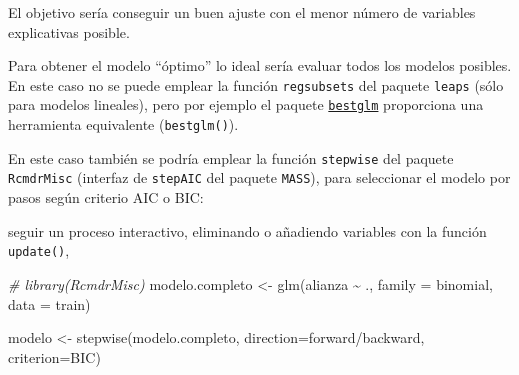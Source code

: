 \documentclass[
]{book}
\newenvironment{Shaded}{\begin{snugshade}}{\end{snugshade}}
\newcommand{\AttributeTok}[1]{\textcolor[rgb]{0.77,0.63,0.00}{#1}}
\newcommand{\CommentTok}[1]{\textcolor[rgb]{0.56,0.35,0.01}{\textit{#1}}}
\newcommand{\FunctionTok}[1]{\textcolor[rgb]{0.00,0.00,0.00}{#1}}
\newcommand{\NormalTok}[1]{#1}
\newcommand{\OtherTok}[1]{\textcolor[rgb]{0.56,0.35,0.01}{#1}}
\newcommand{\SpecialCharTok}[1]{\textcolor[rgb]{0.00,0.00,0.00}{#1}}
\newcommand{\StringTok}[1]{\textcolor[rgb]{0.31,0.60,0.02}{#1}}
\theoremstyle{break}
\theoremstyle{definition}
\theoremstyle{definition}
\theoremstyle{definition}
\theoremstyle{definition}
\theoremstyle{remark}
\begin{document}
El objetivo sería conseguir un buen ajuste con el menor número de variables explicativas posible.

Para obtener el modelo ``óptimo'' lo ideal sería evaluar todos los modelos posibles.
En este caso no se puede emplear la función \texttt{regsubsets} del paquete \texttt{leaps} (sólo para modelos lineales),
pero por ejemplo el paquete
\href{https://cran.r-project.org/web/packages/bestglm/vignettes/bestglm.pdf}{\texttt{bestglm}}
proporciona una herramienta equivalente (\texttt{bestglm()}).

En este caso también se podría emplear la función \texttt{stepwise} del paquete \texttt{RcmdrMisc} (interfaz de \texttt{stepAIC} del paquete \texttt{MASS}), para seleccionar el modelo por pasos según criterio AIC o BIC:

seguir un proceso interactivo, eliminando o añadiendo variables con la función \texttt{update()},

\begin{Shaded}
\begin{Highlighting}[]
\CommentTok{\# library(RcmdrMisc)}
\NormalTok{modelo.completo }\OtherTok{\textless{}{-}} \FunctionTok{glm}\NormalTok{(alianza }\SpecialCharTok{\textasciitilde{}}\NormalTok{ ., }\AttributeTok{family =}\NormalTok{ binomial, }\AttributeTok{data =}\NormalTok{ train)}

\NormalTok{modelo }\OtherTok{\textless{}{-}} \FunctionTok{stepwise}\NormalTok{(modelo.completo, }\AttributeTok{direction=}\StringTok{\textquotesingle{}forward/backward\textquotesingle{}}\NormalTok{, }\AttributeTok{criterion=}\StringTok{\textquotesingle{}BIC\textquotesingle{}}\NormalTok{)}
\end{Highlighting}
\end{Shaded}
\end{document}
